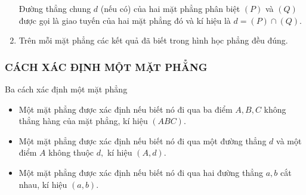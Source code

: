 \begin{enumerate}[\iconMT]
{\begin{tcolorbox}[colframe=cyan,colback=cyan!3!white,boxrule=0.5mm]
		Đường thẳng chung $d$ (nếu có) của hai mặt phẳng phân biệt $(P)$ và $(Q)$ được gọi là giao tuyến của hai mặt phẳng đó và kí hiệu là $d=(P) \cap(Q)$.
	\end{tcolorbox}}{
}
\item {} Trên mỗi mặt phẳng các kết quả đã biết trong hình học phẳng đều đúng.
\end{enumerate}

\subsubsection{CÁCH XÁC ĐỊNH MỘT MẶT PHẲNG}
Ba cách xác định một mặt phẳng
\begin{tcolorbox}[colframe=cyan,colback=red!3!white,boxrule=0.5mm]
	\begin{itemize}
		\item Một mặt phẳng được xác định nếu biết nó đi qua ba điểm $A,B,C$ không thẳng hàng của mặt phẳng, kí hiệu $\left(ABC\right) $.
		\item Một mặt phẳng được xác định nếu biết nó đi qua một đường thẳng $d$ và một điểm $A$ không thuộc $d,$ kí hiệu $\left(A,d\right) $.
		\item Một mặt phẳng được xác định nếu biết nó đi qua hai đường thẳng $a,b$ cắt nhau, kí hiệu $\left(a,b\right) $.
	\end{itemize}
\end{tcolorbox}

